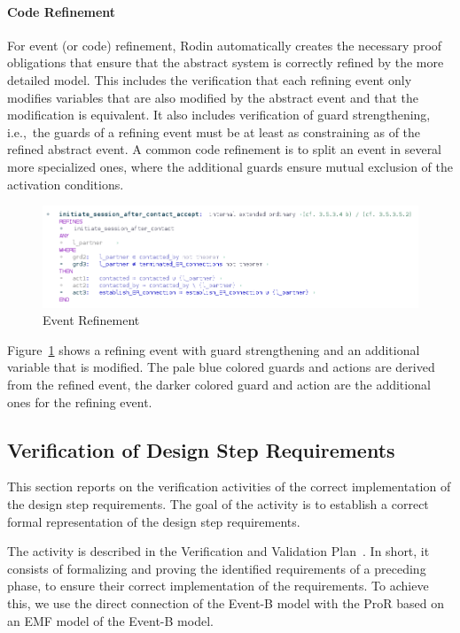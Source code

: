 \documentclass{article}
\begin{document}
\paragraph{Code Refinement}
\label{sec:code-refinement}

For event (or code) refinement, Rodin automatically creates the necessary proof
obligations that ensure that the abstract system is correctly refined by the
more detailed model. This includes the verification that each refining event
only modifies variables that are also modified by the abstract event and that
the modification is equivalent. It also includes verification of guard
strengthening, i.e.,\ the guards of a refining event must be at least as
constraining as of the refined abstract event. A common code refinement is to
split an event in several more specialized ones, where the additional guards
ensure mutual exclusion of the activation conditions.

\begin{figure}[ht]
  \centering
  \includegraphics[width=.9\textwidth]{pictures/EventRefine}
  \caption{Event Refinement}
  \label{fig:event-refine}
\end{figure}

Figure~\ref{fig:event-refine} shows a refining event with guard strengthening
and an additional variable that is modified. The pale blue colored guards and
actions are derived from the refined event, the darker colored guard and action
are the additional ones for the refining event.


\subsection{Verification of Design Step Requirements}
\label{sec:verif-design-step}

This section reports on the verification activities of the correct
implementation of the design step requirements. The goal of the activity is to
establish a correct formal representation of the design step requirements.

The activity is described in the Verification and Validation
Plan~\cite{vnvplan}.  In short, it consists of formalizing and proving the
identified requirements of a preceding phase, to ensure their correct
implementation of the requirements. To achieve this, we use the direct
connection of the Event-B model with the ProR based on an EMF model of the
Event-B model.
\end{document}
